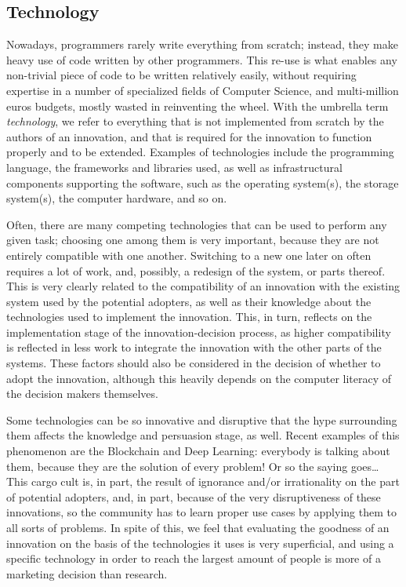 \documentclass[12pt]{article}
\begin{document}
\subsection{Technology}
\label{sec:orgb2b64cb}
Nowadays, programmers rarely write everything from scratch; instead, they make heavy use of code written by other programmers. This re-use is what enables any non-trivial piece of code to be written relatively easily, without requiring expertise in a number of specialized fields of Computer Science, and multi-million euros budgets, mostly wasted in reinventing the wheel. With the umbrella term \emph{technology}, we refer to everything that is not implemented from scratch by the authors of an innovation, and that is required for the innovation to function properly and to be extended. Examples of technologies include the programming language, the frameworks and libraries used, as well as infrastructural components supporting the software, such as the operating system(s), the storage system(s), the computer hardware, and so on.

Often, there are many competing technologies that can be used to perform any given task; choosing one among them is very important, because they are not entirely compatible with one another. Switching to a new one later on often requires a lot of work, and, possibly, a redesign of the system, or parts thereof. This is very clearly related to the compatibility of an innovation with the existing system used by the potential adopters, as well as their knowledge about the technologies used to implement the innovation. This, in turn, reflects on the implementation stage of the innovation-decision process, as higher compatibility is reflected in less work to integrate the innovation with the other parts of the systems. These factors should also be considered in the decision of whether to adopt the innovation, although this heavily depends on the computer literacy of the decision makers themselves.

Some technologies can be so innovative and disruptive that the hype surrounding them affects the knowledge and persuasion stage, as well. Recent examples of this phenomenon are the Blockchain and Deep Learning: everybody is talking about them, because they are the solution of every problem! Or so the saying goes\ldots{} This cargo cult is, in part, the result of ignorance and/or irrationality on the part of potential adopters, and, in part, because of the very disruptiveness of these innovations, so the community has to learn proper use cases by applying them to all sorts of problems. In spite of this, we feel that evaluating the goodness of an innovation on the basis of the technologies it uses is very superficial, and using a specific technology in order to reach the largest amount of people is more of a marketing decision than research.
\end{document}
